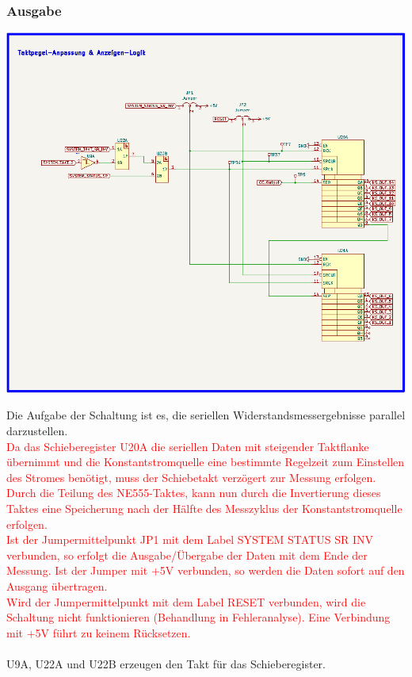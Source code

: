 \subsubsection{Ausgabe}
\begin{center}
\includegraphics[width=15cm]{Bilder/Anzeige-Logik.png}
\end{center}

Die Aufgabe der Schaltung ist es, die seriellen Widerstandsmessergebnisse parallel darzustellen. 
\\
\textcolor{red}{Da das Schieberegister U20A die seriellen Daten mit steigender Taktflanke übernimmt und die Konstantstromquelle eine bestimmte Regelzeit zum Einstellen des Stromes benötigt, muss der Schiebetakt verzögert zur Messung erfolgen. Durch die Teilung des NE555-Taktes, kann nun durch die Invertierung dieses Taktes eine Speicherung nach der Hälfte des Messzyklus der Konstantstromquelle erfolgen.
\\
Ist der Jumpermittelpunkt JP1 mit dem Label \glqq SYSTEM STATUS SR INV \grqq{} verbunden, so erfolgt die Ausgabe/Übergabe der Daten mit dem Ende der Messung. Ist der Jumper mit +5V verbunden, so werden die Daten sofort auf den Ausgang übertragen.
\\
Wird der Jumpermittelpunkt mit dem Label \glqq RESET \grqq{} verbunden, wird die Schaltung nicht funktionieren (Behandlung in Fehleranalyse). Eine Verbindung mit +5V führt zu keinem Rücksetzen.}
\\
\\
U9A, U22A und U22B erzeugen den Takt für das Schieberegister. 

